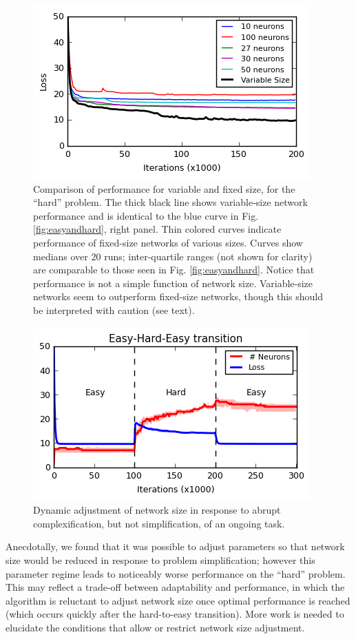 \documentclass{article}
\begin{document}
\begin{figure}[t]
\label{fig:fixedsize}
  \centering
\includegraphics[scale=0.9]{figFS.png}
  \caption{Comparison of performance for variable and fixed size, for the
``hard'' problem. The thick black line shows variable-size network performance
and is identical to the blue curve in Fig. \ref{fig:easyandhard}, right panel.
Thin colored curves indicate performance of fixed-size networks of various
sizes. Curves show medians over 20
runs; inter-quartile ranges (not shown for clarity) are comparable to those
seen in Fig. \ref{fig:easyandhard}. Notice that performance is not a simple
function of network size. Variable-size networks seem to outperform fixed-size
networks, though this should be interpreted with caution (see text). }
\end{figure}

\begin{figure}[b]
\label{fig:easyhardeasy}
  \centering
\includegraphics[scale=0.9]{figEHE.png}
  \caption{Dynamic adjustment of network size in response to abrupt complexification, but not simplification, of an ongoing task.}
\end{figure}



Anecdotally, we found that it was possible to adjust parameters so that network
size would be reduced in response to problem simplification; however this
parameter regime leads to noticeably worse performance on the ``hard''
problem. This may reflect a trade-off between adaptability and performance,
in which the algorithm is reluctant to adjust network size once optimal
performance is reached (which occurs quickly after the hard-to-easy
transition). More work is needed to elucidate the conditions that allow or
restrict network size adjustment.
\end{document}
